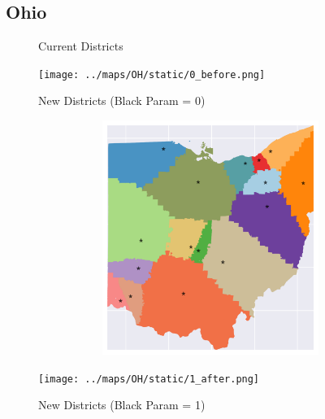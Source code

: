 \subsection{Ohio}
\begin{figure}[htb!] \centering
\caption{ Current Districts }
\texttt{[image: ../maps/OH/static/0\_before.png]}
\caption{ New Districts (Black Param = 0) }
\includegraphics[width=5in,height=3in,keepaspectratio]{../maps/OH/static/0_after.png}
\caption{ New Districts (Black Param = 1) }
\texttt{[image: ../maps/OH/static/1\_after.png]}
\end{figure}

\clearpage
\newpage


